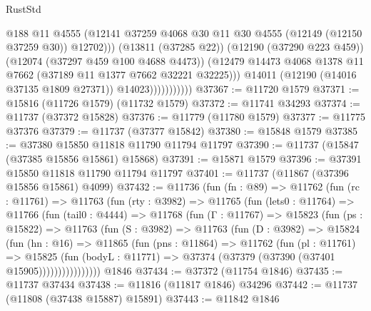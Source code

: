 \begin{lexlean}{RustStd}
\begin{coremodule}
                                @188
                                @11
                                @4555
                                (@12141
                                  @37259
                                  @4068
                                  @30
                                  @11
                                  @30
                                  @4555
                                  (@12149 (@12150 @37259 @30))
                                  @12702)))
                            (@13811 (@37285 @22))
                            (@12190 (@37290 @223 @459))
                            (@12074 (@37297 @459 @100 @4688 @4473))
                            (@12479
                              @14473
                              @4068
                              @1378
                              @11
                              @7662
                              (@37189 @11 @1377 @7662 @32221 @32225)))
                          @14011
                          (@12190 (@14016 @37135 @1809 @27371))
                          @14023)))))))))))
@37367 := @11720 @1579
@37371 := @15816 (@11726 @1579) (@11732 @1579)
@37372 := @11741 @34293
@37374 := @11737 (@37372 @15828)
@37376 := @11779 (@11780 @1579)
@37377 := @11775 @37376
@37379 := @11737 (@37377 @15842)
@37380 := @15848 @1579
@37385 := @37380 @15850 @11818 @11790 @11794 @11797
@37390 := @11737 (@15847 (@37385 @15856 @15861) @15868)
@37391 := @15871 @1579
@37396 := @37391 @15850 @11818 @11790 @11794 @11797
@37401 := @11737 (@11867 (@37396 @15856 @15861) @4099)
@37432 := @11736
    (fun (fn : @89) =>
    @11762
      (fun (rc : @11761) =>
      @11763
        (fun (rty : @3982) =>
        @11765
          (fun (lets0 : @11764) =>
          @11766
            (fun (tail0 : @4444) =>
            @11768
              (fun (Γ : @11767) =>
              @15823
                (fun (ps : @15822) =>
                @11763
                  (fun (S : @3982) =>
                  @11763
                    (fun (D : @3982) =>
                    @15824
                      (fun (hn : @16) =>
                      @11865
                        (fun (pns : @11864) =>
                        @11762
                          (fun (pl : @11761) =>
                          @15825
                            (fun (bodyL : @11771) =>
                            @37374 (@37379 (@37390 (@37401 @15905))))))))))))))))
    @1846
@37434 := @37372 (@11754 @1846)
@37435 := @11737 @37434
@37438 := @11816 (@11817 @1846) @34296
@37442 := @11737 (@11808 (@37438 @15887) @15891)
@37443 := @11842 @1846

\end{coremodule}
\end{lexlean}
